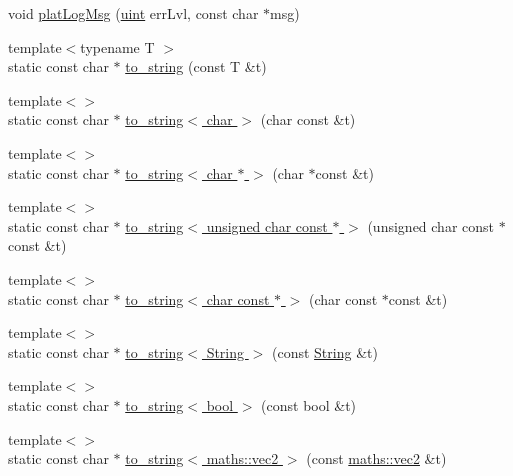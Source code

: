 \begin{DoxyCompactItemize}
\item 
void \hyperlink{namespacespork_1_1debug_ad263309a1fad3a21dcf0c66d025a3d91}{plat\+Log\+Msg} (\hyperlink{defines_8h_a91ad9478d81a7aaf2593e8d9c3d06a14}{uint} err\+Lvl, const char $\ast$msg)
\item 
{\footnotesize template$<$typename T $>$ }\\static const char $\ast$ \hyperlink{namespacespork_1_1debug_afc2bf363eb52ab11d27418006ad8e210}{to\+\_\+string} (const T \&t)
\item 
{\footnotesize template$<$$>$ }\\static const char $\ast$ \hyperlink{namespacespork_1_1debug_aa66a308ebd1125248b867ab43722de8f}{to\+\_\+string$<$ char $>$} (char const \&t)
\item 
{\footnotesize template$<$$>$ }\\static const char $\ast$ \hyperlink{namespacespork_1_1debug_aaa53753be4d2d27251764c381778aa38}{to\+\_\+string$<$ char $\ast$ $>$} (char $\ast$const \&t)
\item 
{\footnotesize template$<$$>$ }\\static const char $\ast$ \hyperlink{namespacespork_1_1debug_a2a5fd3461b42e65daf2b614c769bf849}{to\+\_\+string$<$ unsigned char const $\ast$ $>$} (unsigned char const $\ast$const \&t)
\item 
{\footnotesize template$<$$>$ }\\static const char $\ast$ \hyperlink{namespacespork_1_1debug_a4b09591a3c5a6760a63bd6cf39b48f99}{to\+\_\+string$<$ char const $\ast$ $>$} (char const $\ast$const \&t)
\item 
{\footnotesize template$<$$>$ }\\static const char $\ast$ \hyperlink{namespacespork_1_1debug_ae2c63495057b0491e5de0fc0f7f0922e}{to\+\_\+string$<$ String $>$} (const \hyperlink{my_string_8h_afbeda3fd1bdc8c37d01bdf9f5c8274ff}{String} \&t)
\item 
{\footnotesize template$<$$>$ }\\static const char $\ast$ \hyperlink{namespacespork_1_1debug_a34c91e829f04513719a850e5806a506e}{to\+\_\+string$<$ bool $>$} (const bool \&t)
\item 
{\footnotesize template$<$$>$ }\\static const char $\ast$ \hyperlink{namespacespork_1_1debug_a0080d57663b5fdb7cd10a606a2bf719b}{to\+\_\+string$<$ maths\+::vec2 $>$} (const \hyperlink{structspork_1_1maths_1_1vec2}{maths\+::vec2} \&t)
\item 

\end{DoxyCompactItemize}
